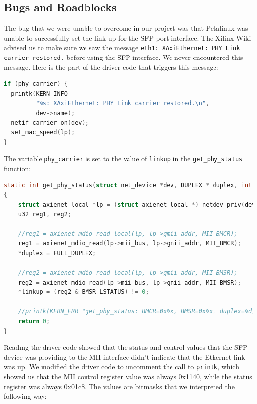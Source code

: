 \documentclass[12pt]{report}
\begin{document}
\subsection{Bugs and Roadblocks}
The bug that we were unable to overcome in our project was that Petalinux was unable to successfully set the link up for the SFP port interface. The Xilinx Wiki advised us to make sure we saw the message
\newline \texttt{eth1: XAxiEthernet: PHY Link carrier restored.}
\newline before using the SFP interface. We never encountered this message. Here is the part of the driver code that triggers this message:
\begin{lstlisting}[language=C]
if (phy_carrier) {
  printk(KERN_INFO
         "%s: XAxiEthernet: PHY Link carrier restored.\n",
         dev->name);
  netif_carrier_on(dev);
  set_mac_speed(lp);
}
\end{lstlisting}
The variable \texttt{phy\_carrier} is set to the value of \texttt{linkup} in the \texttt{get\_phy\_status} function:
\begin{lstlisting}[language=C]
static int get_phy_status(struct net_device *dev, DUPLEX * duplex, int *linkup)
{
	struct axienet_local *lp = (struct axienet_local *) netdev_priv(dev);
	u32 reg1, reg2;

	//reg1 = axienet_mdio_read_local(lp, lp->gmii_addr, MII_BMCR);
	reg1 = axienet_mdio_read(lp->mii_bus, lp->gmii_addr, MII_BMCR);
	*duplex = FULL_DUPLEX;

	//reg2 = axienet_mdio_read_local(lp, lp->gmii_addr, MII_BMSR);
	reg2 = axienet_mdio_read(lp->mii_bus, lp->gmii_addr, MII_BMSR);
	*linkup = (reg2 & BMSR_LSTATUS) != 0;

	//printk(KERN_ERR "get_phy_status: BMCR=0x%x, BMSR=0x%x, duplex=%d, linkup=%d\n", reg1, reg2, *duplex, *linkup);
	return 0;
}
\end{lstlisting}
Reading the driver code showed that the status and control values that the SFP device was providing to the MII interface didn't indicate that the Ethernet link was up. We modified the driver code to uncomment the call to \texttt{printk}, which showed us that the MII control register value was always 0x1140, while the status register was always 0x01c8. The values are bitmasks that we interpreted the following way:
\end{document}
